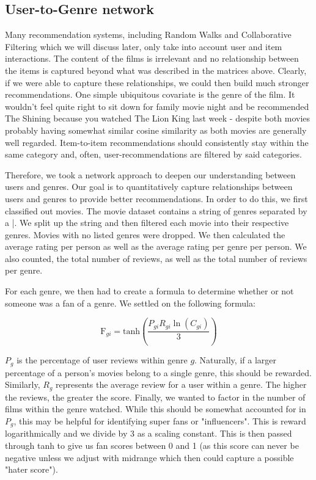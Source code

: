 \documentclass[12pt]{article}
\numberwithin{equation}{section}
\begin{document}
\newpage

\subsection{User-to-Genre network}

Many recommendation systems, including Random Walks and Collaborative Filtering which we will discuss later, only take into account user and item interactions. The content of the films is irrelevant and no relationship between the items is captured beyond what was described in the matrices above. Clearly, if we were able to capture these relationships, we could then build much stronger recommendations. One simple ubiquitous covariate is the genre of the film. It wouldn't feel quite right to sit down for family movie night and be recommended The Shining because you watched The Lion King last week - despite both movies probably having somewhat similar cosine similarity as both movies are generally well regarded. Item-to-item recommendations should consistently stay within the same category and, often, user-recommendations are filtered by said categories.

Therefore, we took a network approach to deepen our understanding between users and genres. Our goal is to quantitatively capture relationships between users and genres to provide better recommendations. In order to do this, we first classified out movies. The movie dataset contains a string of genres separated by a |. We split up the string and then filtered each movie into their respective genres. Movies with no listed genres were dropped. We then calculated the average rating per person as well as the average rating per genre per person. We also counted, the total number of reviews, as well as the total number of reviews per genre. 

For each genre, we then had to create a formula to determine whether or not someone was a fan of a genre. We settled on the following formula:

\[
\text{F}_{gi}= \text{tanh}\left(\frac{P_{gi} R_{gi}\ln(C_{gi})}{3}\right)
\]

$P_g$ is the percentage of user reviews within genre $g$. Naturally, if a larger percentage of a person's movies belong to a single genre, this should be rewarded. Similarly, $R_g$ represents the average review for a user within a genre. The higher the reviews, the greater the score. Finally, we wanted to factor in the number of films within the genre watched. While this should be somewhat accounted for in $P_g$, this may be helpful for identifying super fans or "influencers". This is reward logarithmically and we divide by 3 as a scaling constant.
This is then passed through tanh to give us fan scores between 0 and 1 (as this score can never be negative unless we adjust with midrange which then could capture a possible "hater score").
\end{document}
